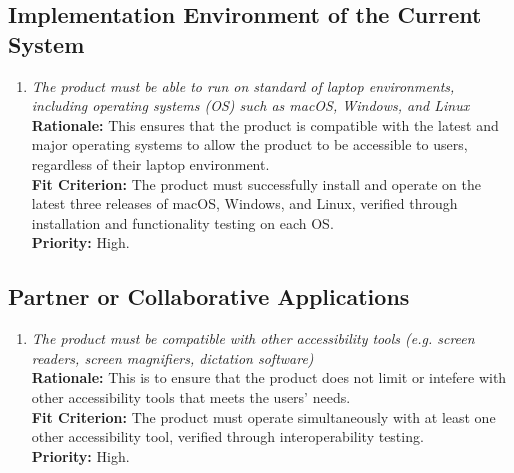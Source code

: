 \documentclass[12pt]{article}
\begin{document}
\subsection{Implementation Environment of the Current System}
\begin{enumerate}[label=MD-IE \arabic*., wide=0pt, leftmargin=*]
  \item \emph{The product must be able to run on standard of laptop environments, including operating systems (OS) such as 
  macOS, Windows, and Linux}\\[2mm]
    {\bf Rationale:} This ensures that the product is compatible with the latest and major operating systems to allow the product to be 
    accessible to users, regardless of their laptop environment.\\
    {\bf Fit Criterion:} The product must successfully install and operate on the latest three releases of macOS, Windows, and Linux,
    verified through installation and functionality testing on each OS.\\
    {\bf Priority:} High.
\end{enumerate}
\subsection{Partner or Collaborative Applications}
\begin{enumerate}[label=MD-PA \arabic*., wide=0pt, leftmargin=*]
  \item \emph{The product must be compatible with other accessibility tools (e.g. screen readers, screen magnifiers, dictation software)}\\[2mm]
    {\bf Rationale:} This is to ensure that the product does not limit or intefere with other accessibility tools that 
    meets the users' needs. \\
    {\bf Fit Criterion:} The product must operate simultaneously with at least one other accessibility tool,
    verified through interoperability testing. \\
    {\bf Priority:} High.
\end{enumerate}
\end{document}
